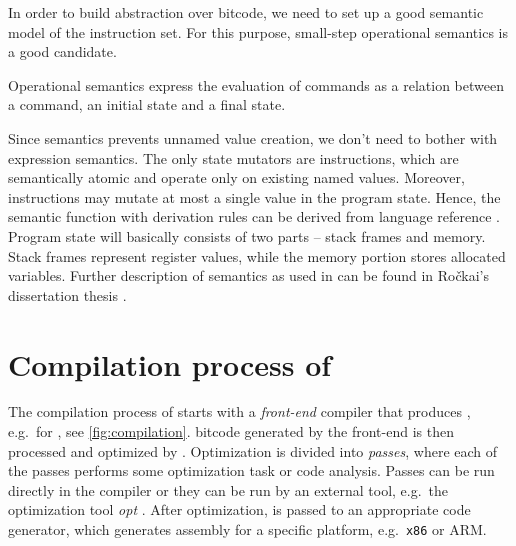 In order to build abstraction over \LLVM bitcode, we need to set up a good
semantic model of the instruction set. For this purpose, small-step operational
semantics \cite{Plotkin04} is a good candidate.

\begin{definition}
Operational semantics express the evaluation of commands as a relation between
a command, an initial state and a final state.
\end{definition}

\noindent
Since \LLVMIR semantics prevents unnamed value creation, we don't need to
bother with expression semantics. The only state mutators are instructions, which are
semantically atomic and operate only on existing named values. Moreover,
instructions may mutate at most a single value in the program state. Hence, the
semantic function with derivation rules can be derived from \LLVM
language reference \cite{LLVM:langref}. Program state will basically
consists of two parts -- stack frames and memory. Stack frames represent
register values, while the memory portion stores allocated variables.
Further description of \LLVM semantics as used in \DIVINE can be found in Ročkai's
dissertation thesis \cite{Rockai15}.

\section{Compilation process of \LLVM} \label{sec:compilation}

The compilation process of \LLVM starts with a \emph{front-end} compiler that produces
\LLVMIR, e.g.~\clang for \Cpp{}, see \autoref{fig:compilation}.
\LLVM bitcode generated by the front-end is then processed and optimized by \LLVM.
Optimization is divided into \LLVM \emph{passes}, where each of the passes
performs some optimization task or code analysis. Passes can be run directly
in the compiler or they can be run by an external tool, e.g.~the \LLVM
optimization tool \emph{opt} \cite{LLVM:opt}. After optimization, \LLVMIR is passed to
an appropriate code generator, which generates assembly for a specific
platform, e.g.~\texttt{x86} or ARM.

